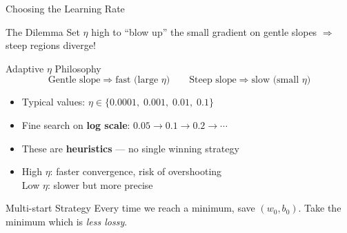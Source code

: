 \documentclass{beamer}
\begin{document}
\begin{frame}[shrink=10]{Choosing the Learning Rate}
  \begin{alertblock}{The Dilemma}
    Set $\eta$ high to ``blow up'' the small gradient on gentle slopes
    $\Rightarrow$ steep regions diverge!
  \end{alertblock}

  \medskip

  \begin{block}{Adaptive $\eta$ Philosophy}
    \[
      \text{Gentle slope} \Rightarrow \text{fast (large } \eta\text{)}
      \qquad
      \text{Steep slope} \Rightarrow \text{slow (small } \eta\text{)}
    \]
    \begin{itemize}\setlength\itemsep{5pt}
      \item Typical values: $\eta\in\{0.0001,\;0.001,\;0.01,\;\mathbf{0.1}\}$
      \item Fine search on \textbf{log scale}:
            $0.05\to 0.1\to 0.2\to\cdots$
      \item These are \textbf{heuristics} --- no single winning strategy
      \item High $\eta$: faster convergence, risk of overshooting\\
            Low $\eta$: slower but more precise
    \end{itemize}
  \end{block}

  \medskip

  \begin{block}{Multi-start Strategy}
    Every time we reach a minimum, save $(w_0,b_0)$.
    Take the minimum which is \emph{less lossy}.
  \end{block}
\end{frame}
\end{document}
